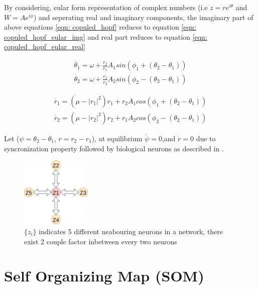 \documentclass{article}
\begin{document}
By considering, eular form representation of complex numbers (i.e $z = re^{i\theta}$ and $W = Ae^{i\phi}$) and seperating real and imaginary components, the imaginary part of above equations \ref{eqn: copuled_hopf} reduces to equation \ref{eqn: copuled_hopf_eular_img} and real part reduces to equation \ref{eqn: copuled_hopf_eular_real} 

\begin{subequations}
\label{eqn: copuled_hopf_eular_img}
\begin{align}
 \dot{\theta_1} = \omega + \frac{r_2}{r_1} A_1sin(\phi_1 + (\theta_2 - \theta_1)) \\ 
 \dot{\theta_2} = \omega + \frac{r_1}{r_2} A_2sin(\phi_2 - (\theta_2 - \theta_1)) 
\end{align}
\end{subequations}

\begin{subequations}
\label{eqn: copuled_hopf_eular_real}
\begin{align}
 \dot{r_1} = (\mu - |r_1|^2)r_1 + r_2 A_1cos(\phi_1 + (\theta_2 - \theta_1)) \\ 
 \dot{r_2} = (\mu - |r_2|^2)r_2 + r_1 A_2cos(\phi_2 - (\theta_2 - \theta_1)) 
\end{align}
\end{subequations}

Let ($\psi = \theta_2 - \theta_1$, $r = r_2 - r_1$), at equilibrium $\dot{\psi} = 0$,and $\dot{r} = 0$ due to syncronization property followed by biological neurons as described in \cite{varela2001brainweb, golomb1994clustering}.

\begin{figure}
 \centering
 \includegraphics[width=0.3\textwidth]{network.png}
 \caption{$\{z_i\}$ indicates 5 different neabouring neurons in a network, there exist 2 couple factor inbetween every two neurons}
 \label{fig: network_neurons}
\end{figure}

\section{Self Organizing Map (SOM)}
\end{document}
